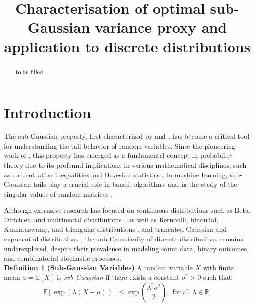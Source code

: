 \documentclass[a4paper, 10pt]{article}
\title{Characterisation of optimal sub-Gaussian variance proxy and application to discrete distributions}
\date{}
\theoremstyle{definition}
\begin{document}
\maketitle


\begin{abstract}
to be filled 

\end{abstract}


\section{Introduction}\label{s:1}
The sub-Gaussian property, first characterized by \citet{Kahane1960PropritsLD} and \citet{buldygin1980sub}, has become a critical tool for understanding the tail behavior of random variables. Since the pioneering work of \citet{buldygin1980sub}, this property has emerged as a fundamental concept in probability theory due to its profound implications in various mathematical disciplines, such as concentration inequalities \citep{Hoeffding1963, boucheron2003concentration, raginsky2013concentration} and Bayesian statistics \citep{elder2016bayesian, catoni2007pac, vladimirova2019understanding, vladimirova2020sub}. In machine learning, sub-Gaussian tails play a crucial role in bandit algorithms \citep{bubeck2012regret} and in the study of the singular values of random matrices \citep{rudelson2010non}.

Although extensive research has focused on continuous distributions such as Beta, Dirichlet, and multimodal distributions \citep{marchal2017sub}, as well as Bernoulli, binomial, Kumaraswamy, and triangular distributions \citep{arbel2020strict}, and truncated Gaussian and exponential distributions \citep{barreto2024optimal}, the sub-Gaussianity of discrete distributions remains underexplored, despite their prevalence in modeling count data, binary outcomes, and combinatorial stochastic processes.\\


\textbf{Definition 1 (Sub-Gaussian Variables)} A random variable \( X \) with finite mean \( \mu = \mathbb{E}[X] \) is \textit{sub-Gaussian} if there exists a constant \( \sigma^2 > 0 \) such that:
\begin{equation}
    \mathbb{E}[\exp(\lambda (X - \mu))] \leq \exp\left(\frac{\lambda^2 \sigma^2}{2}\right), \text{ for all } \lambda \in \mathbb{R}.
    \label{eq:def_sub}
\end{equation}
\end{document}
